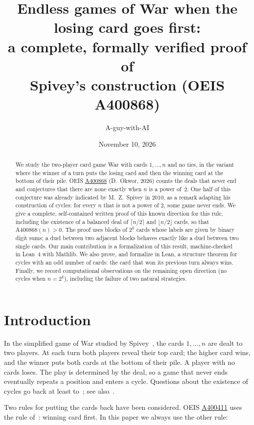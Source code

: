\documentclass[11pt,a4paper]{amsart}
\title[A verified proof of Spivey's construction (losing card first)]{Endless games of War when the losing card goes first:\\ a complete, formally verified proof of\\ Spivey's construction (OEIS A400868)}
\author{A-guy-with-AI}
\date{November 10, 2026}
\theoremstyle{definition}
\theoremstyle{remark}
\newcommand{\oeis}[1]{\href{https://oeis.org/#1}{#1}}
\begin{document}
\begin{abstract}
We study the two-player card game War with cards $1,\dots,n$ and no ties, in the variant where the winner of a turn puts the losing card and then the winning card at the bottom of their pile. OEIS \oeis{A400868} (D.~Okwor, 2026) counts the deals that never end and conjectures that there are none exactly when $n$ is a power of~$2$. One half of this conjecture was already indicated by M.~Z.~Spivey in 2010, as a remark adapting his construction of cycles: for every $n$ that is not a power of $2$, some game never ends. We give a complete, self-contained written proof of this known direction for this rule, including the existence of a balanced deal of $\lceil n/2\rceil$ and $\lfloor n/2\rfloor$ cards, so that $\mathrm{A400868}(n)>0$. The proof uses blocks of $2^k$ cards whose labels are given by binary digit sums; a duel between two adjacent blocks behaves exactly like a duel between two single cards. Our main contribution is a formalization of this result, machine-checked in Lean~4 with Mathlib. We also prove, and formalize in Lean, a structure theorem for cycles with an odd number of cards: the card that won its previous turn always wins. Finally, we record computational observations on the remaining open direction (no cycles when $n=2^k$), including the failure of two natural strategies.
\end{abstract}

\maketitle

\section{Introduction}

In the simplified game of War studied by Spivey~\cite{Spivey}, the cards $1,\dots,n$ are dealt to two players. At each turn both players reveal their top card; the higher card wins, and the winner puts both cards at the bottom of their pile. A player with no cards loses. The play is determined by the deal, so a game that never ends eventually repeats a position and enters a cycle. Questions about the existence of cycles go back at least to~\cite{LR,Spivey}; see also~\cite{BCMM,KP,DM}.

Two rules for putting the cards back have been considered. OEIS \oeis{A400411} uses the rule of~\cite{Spivey}: winning card first. In this paper we always use the other rule:
\end{document}
